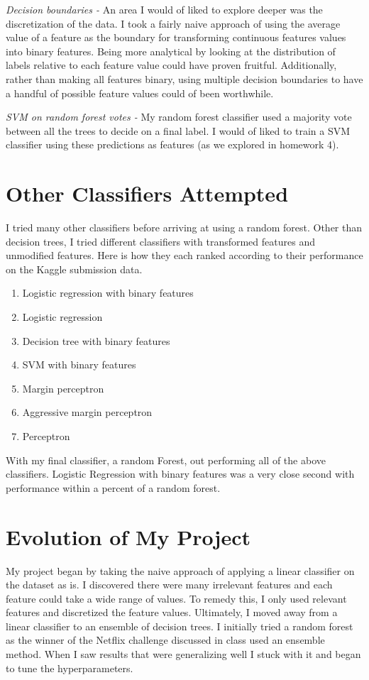 \documentclass[a4paper, 11pt]{article} %
\begin{document}
\textit{Decision boundaries - }An area I would of liked to explore deeper was the discretization of the data. I took a fairly naive approach of using the average value of a feature as the boundary for transforming continuous features values into binary features. Being more analytical by looking at the distribution of labels relative to each feature value could have proven fruitful. Additionally, rather than making all features binary, using multiple decision boundaries to have a handful of possible feature values could of been worthwhile.

\bigbreak
\noindent
\textit{SVM on random forest votes - } My random forest classifier used a majority vote between all the trees to decide on a final label. I would of liked to train a SVM classifier using these predictions as features (as we explored in homework 4).

\section*{Other Classifiers Attempted}

I tried many other classifiers before arriving at using a random forest. Other than decision trees, I tried different classifiers with transformed features and unmodified features. Here is how they each ranked according to their performance on the Kaggle submission data. 

\begin{enumerate}
	\item Logistic regression with binary features
	\item Logistic regression
	\item Decision tree with binary features
	\item SVM with binary features
	\item Margin perceptron
	\item Aggressive margin perceptron
	\item Perceptron
\end{enumerate}

With my final classifier, a random Forest, out performing all of the above classifiers. Logistic Regression with binary features was a very close second with performance within a percent of a random forest.

\section*{Evolution of My Project}

My project began by taking the naive approach of applying a linear classifier on the dataset as is. I discovered there were many irrelevant features and each feature could take a wide range of values. To remedy this, I only used relevant features and discretized the feature values. Ultimately, I moved away from a linear classifier to an ensemble of decision trees. I initially tried a random forest as the winner of the Netflix challenge discussed in class used an ensemble method. When I saw results that were generalizing well I stuck with it and began to tune the hyperparameters.
\end{document}

